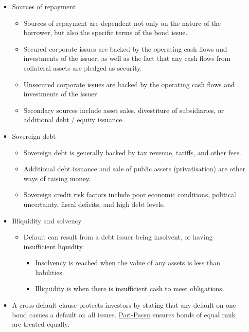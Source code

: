 \documentclass[../notes_compiled.tex]{subfiles}
\begin{document}
\begin{itemize}
\item Sources of repayment
\begin{itemize}
\item Sources of repayment are dependent not only on the nature of the borrower, but also the specific terms of the bond issue.
\item Secured corporate issues are backed by the operating cash flows and investments of the issuer, as well as the fact that any cash flows from collateral assets are pledged as security.
\item Unsecured corporate issues are backed by the operating cash flows and investments of the issuer.
\item Secondary sources include asset sales, divestiture of subsidiaries, or additional debt / equity issuance.
\end{itemize}

\item Sovereign debt
\begin{itemize}
\item Sovereign debt is generally backed by tax revenue, tariffs, and other fees.
\item Additional debt issuance and sale of public assets (privatisation) are other ways of raising money.
\item Sovereign credit risk factors include poor economic conditions, political uncertainty, fiscal deficits, and high debt levels.
\end{itemize}

\item Illiquidity and solvency
\begin{itemize}
\item Default can result from a debt issuer being insolvent, or having insufficient liquidity.
\begin{itemize}
\item Insolvency is reached when the value of any assets is less than liabilities.
\item Illiquidity is when there is insufficient cash to meet obligations.
\end{itemize}
\end{itemize}

\item A cross-default clause protects investors by stating that any default on one bond casues a default on all issues. \underline{Pari-Passu} ensures bonds of equal rank are treated equally.

\end{itemize}
\end{document}
